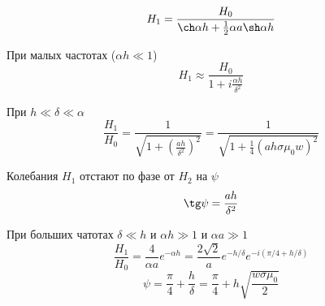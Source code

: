  \[
     H_{1} = \frac{H_{0}}{\ch\alpha h + \frac{1}{2}\alpha a\sh\alpha h}
 \]
 
 При малых частотах ($\alpha h\ll 1$)
 \[
     H_{1}\approx \frac{H_{0}}{1+i\frac{\alpha h}{\delta^{2}}}
 \]
 
 При $h\ll\delta\ll\alpha$
 \[
     \frac{H_{1}}{H_{0}} = \frac{1}{\sqrt{1+\left(\frac{ah}{\delta^{2}}\right)^{2}}} =
     \frac{1}{\sqrt{1+\frac{1}{4}\left(ah\sigma\mu_{0}w\right)^{2}}}
 \]

 Колебания $H_{1}$ отстают по фазе от $H_{2}$ на $\psi$
 \[
     \tg\psi = \frac{ah}{\delta^{2}}    
 \]

 При больших чатотах $\delta\ll h$ и $\alpha h\gg 1$ и $\alpha a\gg 1$
 \[
     \frac{H_{1}}{H_{0}} = \frac{4}{\alpha a}e^{-\alpha h} = \frac{2\sqrt{2}}{a}e^{-h/\delta}e^{-i\left(\pi/4 + h/\delta\right)}    
 \]
\[
    \psi = \frac{\pi}{4} + \frac{h}{\delta} = \frac{\pi}{4} + h\sqrt{\frac{w\sigma\mu_{0}}{2}}
\]
\begin{figure}[ht!]
\end{figure}

 
 
